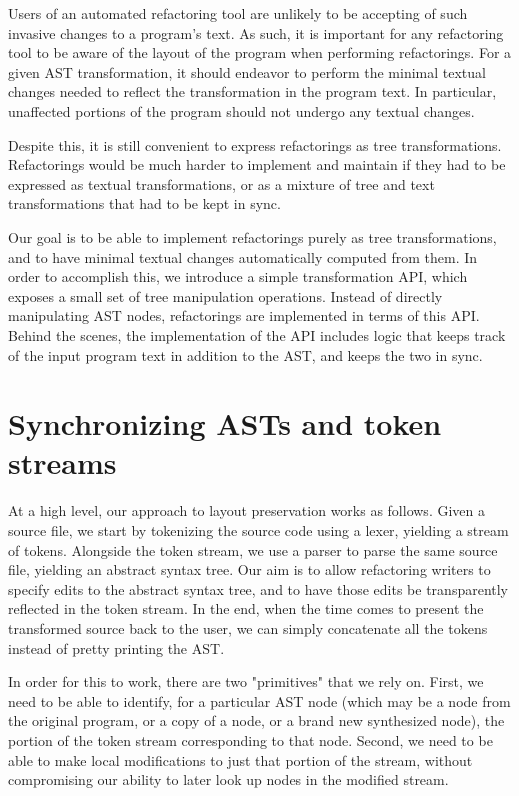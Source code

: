 Users of an automated refactoring tool are unlikely to be accepting of such
invasive changes to a program's text. As such, it is important for any
refactoring tool to be aware of the layout of the program when performing
refactorings. For a given AST transformation, it should endeavor to perform the
minimal textual changes needed to reflect the transformation in the program
text. In particular, unaffected portions of the program should not undergo any
textual changes.

Despite this, it is still convenient to express refactorings as tree
transformations. Refactorings would be much harder to implement and maintain if
they had to be expressed as textual transformations, or as a mixture of tree
and text transformations that had to be kept in sync.

Our goal is to be able to implement refactorings purely as tree
transformations, and to have minimal textual changes automatically computed
from them. In order to accomplish this, we introduce a simple transformation
API, which exposes a small set of tree manipulation operations. Instead of
directly manipulating AST nodes, refactorings are implemented in terms of this
API. Behind the scenes, the implementation of the API includes logic that keeps
track of the input program text in addition to the AST, and keeps the two in
sync.

\section{Synchronizing ASTs and token streams}

At a high level, our approach to layout preservation works as follows. Given a
\matlab source file, we start by tokenizing the source code using a \matlab
lexer, yielding a stream of tokens. Alongside the token stream, we use a
\matlab parser to parse the same source file, yielding an abstract syntax tree.
Our aim is to allow refactoring writers to specify edits to the abstract syntax
tree, and to have those edits be transparently reflected in the token stream.
In the end, when the time comes to present the transformed source back to the
user, we can simply concatenate all the tokens instead of pretty printing the
AST.

In order for this to work, there are two "primitives" that we rely on. First,
we need to be able to identify, for a particular AST node (which may be a node
from the original program, or a copy of a node, or a brand new synthesized
node), the portion of the token stream corresponding to that node. Second, we
need to be able to make local modifications to just that portion of the stream,
without compromising our ability to later look up nodes in the modified stream.

